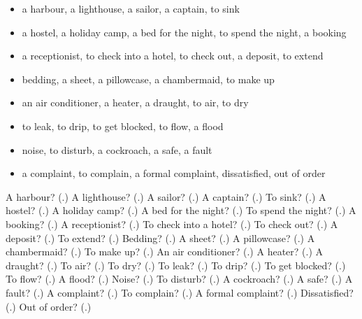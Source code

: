 \begin{itemize}
\raggedright
  \item a harbour, a lighthouse, a sailor, a captain, to sink
  \item a hostel, a holiday camp, a bed for the night, to spend the night, a booking
  \item a receptionist, to check into a hotel, to check out, a deposit, to extend
  \item bedding, a sheet, a pillowcase, a chambermaid, to make up
  \item an air conditioner, a heater, a draught, to air, to dry
  \item to leak, to drip, to get blocked, to flow, a flood
  \item noise, to disturb, a cockroach, a safe, a fault
  \item a complaint, to complain, a formal complaint, dissatisfied, out of order
\end{itemize}

\begin{tcolorbox}[breakable,colback=teal!4,colframe=teal!35!black,title={Before you move on}]
A harbour? (\textbf{}.) A lighthouse? (\textbf{}.) A sailor? (\textbf{}.) A captain? (\textbf{}.) To sink? (\textbf{}.) A hostel? (\textbf{}.) A holiday camp? (\textbf{}.) A bed for the night? (\textbf{}.) To spend the night? (\textbf{}.) A booking? (\textbf{}.) A receptionist? (\textbf{}.) To check into a hotel? (\textbf{}.) To check out? (\textbf{}.) A deposit? (\textbf{}.) To extend? (\textbf{}.) Bedding? (\textbf{}.) A sheet? (\textbf{}.) A pillowcase? (\textbf{}.) A chambermaid? (\textbf{}.) To make up? (\textbf{}.) An air conditioner? (\textbf{}.) A heater? (\textbf{}.) A draught? (\textbf{}.) To air? (\textbf{}.) To dry? (\textbf{}.) To leak? (\textbf{}.) To drip? (\textbf{}.) To get blocked? (\textbf{}.) To flow? (\textbf{}.) A flood? (\textbf{}.) Noise? (\textbf{}.) To disturb? (\textbf{}.) A cockroach? (\textbf{}.) A safe? (\textbf{}.) A fault? (\textbf{}.) A complaint? (\textbf{}.) To complain? (\textbf{}.) A formal complaint? (\textbf{}.) Dissatisfied? (\textbf{}.) Out of order? (\textbf{}.)
\end{tcolorbox}
